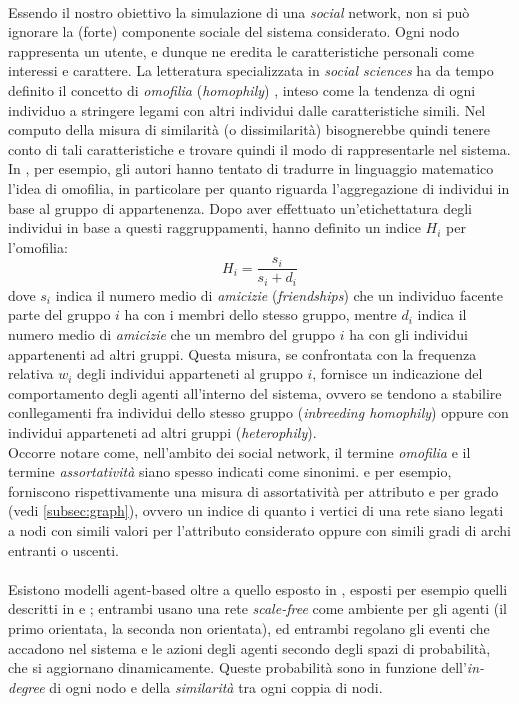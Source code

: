\documentclass[a4paper,12pt]{article}
\begin{document}
\\
Essendo il nostro obiettivo la simulazione di una \textit{social} network, non si può ignorare la (forte) componente sociale del sistema considerato. Ogni nodo rappresenta un utente, e dunque ne eredita le caratteristiche personali come interessi e carattere. La letteratura specializzata in \textit{social sciences} ha da tempo definito il concetto di \textit{omofilia} (\textit{homophily}) \cite{homo} \cite{newman}, inteso come la tendenza di ogni individuo a stringere legami con altri individui dalle caratteristiche simili. Nel computo della misura di similarità (o dissimilarità) bisognerebbe quindi tenere conto di tali caratteristiche e trovare quindi il modo di rappresentarle nel sistema. In \cite{group}, per esempio, gli autori hanno tentato di tradurre in linguaggio matematico l'idea di omofilia, in particolare per quanto riguarda l'aggregazione di individui in base al gruppo di appartenenza. Dopo aver effettuato un'etichettatura degli individui in base a questi raggruppamenti, hanno definito un indice  $H_i$ per l'omofilia:
\begin{equation}
H_i = \dfrac{s_i}{s_i + d_i}
\end{equation}
dove $s_i$ indica il numero medio di \textit{amicizie} (\textit{friendships}) che un individuo facente parte del gruppo $i$ ha con i membri dello stesso gruppo, mentre $d_i$ indica il numero medio di \textit{amicizie} che un membro del gruppo $i$ ha con gli individui appartenenti ad altri gruppi. Questa misura, se confrontata con la frequenza relativa $w_i$ degli individui apparteneti al gruppo $i$, fornisce un indicazione del comportamento degli agenti all'interno del sistema, ovvero se tendono a stabilire conllegamenti fra individui dello stesso gruppo (\textit{inbreeding homophily}) oppure con individui apparteneti ad altri gruppi (\textit{heterophily}).\\
Occorre notare come, nell'ambito dei social network, il termine \textit{omofilia} e il termine \textit{assortatività} siano spesso indicati come sinonimi. \cite{newman} e \cite{assor} per esempio, forniscono rispettivamente una misura di assortatività per attributo e per grado (vedi \ref{subsec:graph}), ovvero un indice di quanto i vertici di una rete siano legati a nodi con simili valori per l'attributo considerato oppure con simili gradi di archi entranti o uscenti.
\\
\\
Esistono modelli agent-based oltre a quello esposto in \cite{gilbert}, esposti per esempio quelli descritti in \cite{red} e \cite{det}; entrambi usano una rete \textit{scale-free} come ambiente per gli agenti (il primo orientata, la seconda non orientata), ed entrambi regolano gli eventi che accadono nel sistema e le azioni degli agenti secondo degli spazi di probabilità, che si aggiornano dinamicamente. Queste probabilità sono in funzione dell'\textit{in-degree} di ogni nodo e della \textit{similarità} tra ogni coppia di nodi. \\
\end{document}
